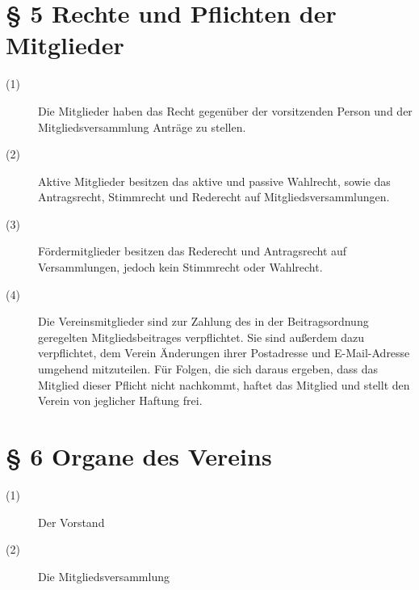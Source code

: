 \documentclass[a4paper,12pt]{scrartcl}
\begin{document}
\section*{\S{} 5 Rechte und Pflichten der Mitglieder}
\begin{description} 

\item[(1)] Die Mitglieder haben das Recht gegenüber der vorsitzenden Person und der Mitgliedsversammlung Anträge zu stellen.
\item[(2)] Aktive Mitglieder besitzen das aktive und passive Wahlrecht, sowie das Antragsrecht, Stimmrecht und Rederecht auf Mitgliedsversammlungen.
\item[(3)] Fördermitglieder besitzen das Rederecht und Antragsrecht auf Versammlungen, jedoch kein Stimmrecht oder Wahlrecht.
\item[(4)] Die Vereinsmitglieder sind zur Zahlung des in der Beitragsordnung geregelten Mitgliedsbeitrages verpflichtet. Sie sind außerdem dazu verpflichtet, dem Verein Änderungen ihrer Postadresse und E-Mail-Adresse umgehend mitzuteilen. Für Folgen, die sich daraus ergeben, dass das Mitglied dieser Pflicht nicht nachkommt, haftet das Mitglied und stellt den Verein von jeglicher Haftung frei.

\end{description}



\section*{\S{} 6 Organe des Vereins}
\begin{description} 

\item[(1)] Der Vorstand
\item[(2)] Die Mitgliedsversammlung

\end{description}
\end{document}
